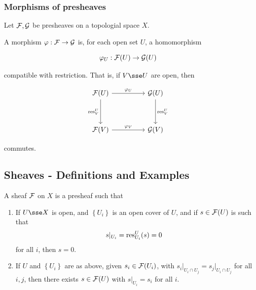\documentclass{article}
\newcommand{\set}[1]{\left\{#1\right\}}
\begin{document}
\subsubsection*{Morphisms of presheaves}

Let \(\mathcal{F}, \mathcal{G}\) be presheaves on a topologial space \(X\).

\begin{definition}
    A morphism \(\varphi : \mathcal{F} \to \mathcal{G}\) is, for each open set \(U\), a homomorphism

    \[\varphi_U : \mathcal{F}(U) \to \mathcal{G}(U)\]

    compatible with restriction. That is, if \(V \sse U\) are open, then

\[\begin{tikzcd}
	{\mcF(U)} && {\mcG(U)} \\
	\\
	{\mcF(V)} && {\mcG(V)}
	\arrow["{\varphi_V}", from=3-1, to=3-3]
	\arrow["{\varphi_U}", from=1-1, to=1-3]
	\arrow["{\res_V^U}"', from=1-1, to=3-1]
	\arrow["{\res_V^U}", from=1-3, to=3-3]
\end{tikzcd}\]

commutes.
\end{definition}

\subsection{Sheaves - Definitions and Examples}

\begin{definition}
    [Sheaf] A sheaf \(\mathcal{F}\) on \(X\) is a presheaf such that

    \begin{enumerate}[label=S\arabic*.]
        \item If \(U \sse X\) is open, and \(\set{U_i}\) is an open cover of \(U\), and if \(s \in \mathcal{F}(U)\) is such that
        \[s\vert_{U_i} = \operatorname{res}_{U_i}^U(s) = 0\]
        for all \(i\), then \(s = 0\).
        \item If \(U\) and \(\set{U_i}\) are as above, given \(s_i \in \mathcal{F}(U_i)\), with \(s_i\vert_{U_i \cap U_j} = s_j\vert_{U_i \cap U_j}\) for all \(i, j\), then there exists \(s \in \mathcal{F}(U)\) with \(s\vert_{U_i} = s_i\) for all \(i\).  
    \end{enumerate}
\end{definition}
\end{document}
